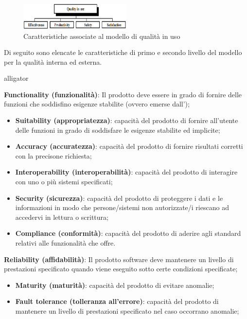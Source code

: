 \begin{figure}[h!]
	\centering
	\includegraphics[width=0.50\textwidth]{img/in_use.png}
	\caption{Caratteristiche associate al modello di qualità in uso}
	\label{fig:in_use}
\end{figure}

Di seguito sono elencate le caratteristiche di primo e secondo livello del modello per la qualità interna ed esterna.
\begin{labeling}{alligator}
	\item \textbf{Functionality (funzionalità)}: Il prodotto deve essere in grado di fornire delle funzioni che soddisfino esigenze stabilite (ovvero emerse dall'\AdR{});
	\begin{itemize}
		\item \textbf{Suitability (appropriatezza)}: capacità del prodotto di fornire all'utente delle funzioni in grado di soddisfare le esigenze stabilite ed implicite;
		
		\item \textbf{Accuracy (accuratezza)}: capacità del prodotto di fornire risultati corretti con la precisone richiesta;
		
		\item \textbf{Interoperability (interoperabilità)}: capacità del prodotto di interagire con uno o più sistemi specificati;
		
		\item \textbf{Security (sicurezza)}: capacità del prodotto di proteggere i dati e le informazioni in modo che persone/sistemi non autorizzate/i riescano ad accedervi in lettura o scrittura;
		
		\item \textbf{Compliance (conformità)}: capacità del prodotto di aderire agli standard relativi alle funzionalità che offre.
	\end{itemize}
	\item \textbf{Reliability (affidabilità)}: Il prodotto software deve mantenere un livello di prestazioni specificato quando viene eseguito sotto certe condizioni specificate;
	\begin{itemize}
		\item \textbf{Maturity (maturità)}: capacità del prodotto di evitare anomalie;
		
		\item \textbf{Fault tolerance (tolleranza all'errore)}: capacità del prodotto di mantenere un livello di prestazioni specificato nel caso occorrano anomalie;
		

\end{itemize}
\end{labeling}
